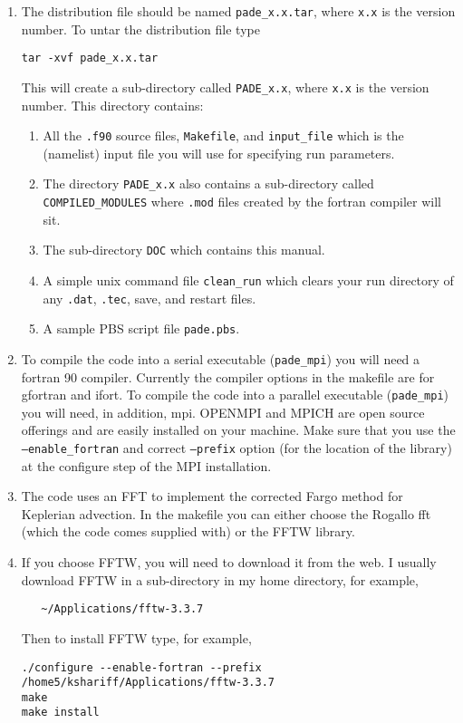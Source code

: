 \documentclass[11pt]{amsart}
\begin{document}
\begin{enumerate}
\item The distribution file should be named {\tt pade\_x.x.tar}, where {\tt x.x} is the version number.  To untar the distribution file type

\begin{verbatim}
tar -xvf pade_x.x.tar
\end{verbatim}
%
This will create a sub-directory called {\tt PADE\_x.x}, where {\tt x.x} is the version number.  This directory
contains:
\begin{enumerate}
\item All the {\tt .f90} source files, {\tt Makefile},
and {\tt input\_file} which is the (namelist) input file you will use for specifying run
parameters.  
\item The directory {\tt PADE\_x.x} also contains a sub-directory called {\tt COMPILED\_MODULES}
where {\tt .mod} files created by the fortran compiler will sit.
\item The sub-directory {\tt DOC} which contains this manual.
\item A simple unix command file {\tt clean\_run} which
clears your run directory of any {\tt .dat}, {\tt .tec}, save, and restart files.
\item A sample PBS script file {\tt pade.pbs}.
\end{enumerate}

\item To compile the code into a serial executable ({\tt pade\_mpi}) you will need a fortran 90 compiler.
Currently the compiler options in the makefile are for gfortran and ifort.
To compile the code into a parallel executable ({\tt pade\_mpi}) you will need,
in addition, mpi.  OPENMPI and MPICH are open source offerings and are easily installed
on your machine.  Make sure that you use the {\tt --enable\_fortran} and correct {\tt --prefix} option (for the location
of the library) at the configure step of the MPI installation.

\item The code uses an FFT to implement the corrected Fargo method for Keplerian advection.
In the makefile you can either choose the Rogallo fft (which the code comes supplied with) or
the FFTW library.  

\item If you choose FFTW, you will need to download it from the web.
I usually download FFTW in a sub-directory in my home directory, for example,
\begin{verbatim}
   ~/Applications/fftw-3.3.7
\end{verbatim}
Then to install FFTW type, for example,
\begin{verbatim}
./configure --enable-fortran --prefix /home5/kshariff/Applications/fftw-3.3.7
make
make install
\end{verbatim}


\end{enumerate}
\end{document}
